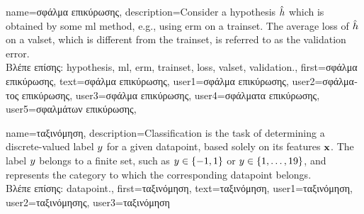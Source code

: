 {name={\foreignlanguage{greek}{σφάλμα επικύρωσης}},
 description={Consider a \gls{hypothesis} $\hat{h}$ which is 
 	obtained by some \gls{ml} method, e.g., using \gls{erm} on a \gls{trainset}. The average \gls{loss} 
 	of $\hat{h}$ on a \gls{valset}, which is different from the \gls{trainset}, is referred 
 	to as the \gls{validation} error.\\
	\foreignlanguage{greek}{Βλέπε επίσης:} \gls{hypothesis}, \gls{ml}, \gls{erm}, \gls{trainset}, \gls{loss}, \gls{valset}, \gls{validation}.},
	first={\foreignlanguage{greek}{σφάλμα επικύρωσης}},
	text={\foreignlanguage{greek}{σφάλμα επικύρωσης}},
	user1={\foreignlanguage{greek}{σφάλμα επικύρωσης}}, %
	user2={\foreignlanguage{greek}{σφάλματος επικύρωσης}}, %
	user3={\foreignlanguage{greek}{σφάλμα επικύρωσης}}, %
	user4={\foreignlanguage{greek}{σφάλματα επικύρωσης}}, %
	user5={\foreignlanguage{greek}{σφαλμάτων επικύρωσης}}, %
}

{name={\foreignlanguage{greek}{ταξινόμηση}},
 description={Classification is the task of determining a 
 	discrete-valued label $y$ for a given \gls{datapoint}, based solely on its 
 	features ${\bf x}$. The label $y$ belongs to a finite set, such as 
 	$y \in \{-1,1\}$ or $y \in \{1,\ldots,19\}$, and represents the 
 	category to which the corresponding \gls{datapoint} belongs.\\
	\foreignlanguage{greek}{Βλέπε επίσης:} \gls{datapoint}.},
	first={\foreignlanguage{greek}{ταξινόμηση}},
	text={\foreignlanguage{greek}{ταξινόμηση}},
	user1={\foreignlanguage{greek}{ταξινόμηση}}, %
	user2={\foreignlanguage{greek}{ταξινόμησης}}, %
	user3={\foreignlanguage{greek}{ταξινόμηση}} %
}

